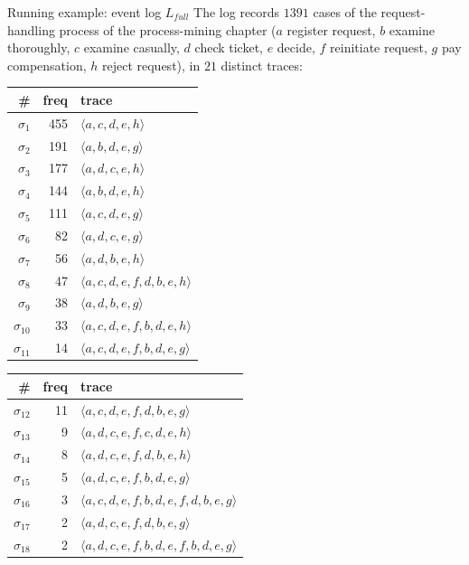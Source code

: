 \begin{examplebox}{Running example: event log $L_{full}$}
The log records $1391$ cases of the request-handling process of the process-mining chapter ($a$ register request, $b$ examine thoroughly, $c$ examine casually, $d$ check ticket, $e$ decide, $f$ reinitiate request, $g$ pay compensation, $h$ reject request), in $21$ distinct traces:
\begin{center}
\scriptsize
\begin{tabular}{rrl}
\toprule
\# & freq & trace \\
\midrule
$\sigma_1$ & 455 & $\langle a,c,d,e,h\rangle$ \\
$\sigma_2$ & 191 & $\langle a,b,d,e,g\rangle$ \\
$\sigma_3$ & 177 & $\langle a,d,c,e,h\rangle$ \\
$\sigma_4$ & 144 & $\langle a,b,d,e,h\rangle$ \\
$\sigma_5$ & 111 & $\langle a,c,d,e,g\rangle$ \\
$\sigma_6$ & 82 & $\langle a,d,c,e,g\rangle$ \\
$\sigma_7$ & 56 & $\langle a,d,b,e,h\rangle$ \\
$\sigma_8$ & 47 & $\langle a,c,d,e,f,d,b,e,h\rangle$ \\
$\sigma_9$ & 38 & $\langle a,d,b,e,g\rangle$ \\
$\sigma_{10}$ & 33 & $\langle a,c,d,e,f,b,d,e,h\rangle$ \\
$\sigma_{11}$ & 14 & $\langle a,c,d,e,f,b,d,e,g\rangle$ \\
\bottomrule
\end{tabular}
\quad
\begin{tabular}{rrl}
\toprule
\# & freq & trace \\
\midrule
$\sigma_{12}$ & 11 & $\langle a,c,d,e,f,d,b,e,g\rangle$ \\
$\sigma_{13}$ & 9 & $\langle a,d,c,e,f,c,d,e,h\rangle$ \\
$\sigma_{14}$ & 8 & $\langle a,d,c,e,f,d,b,e,h\rangle$ \\
$\sigma_{15}$ & 5 & $\langle a,d,c,e,f,b,d,e,g\rangle$ \\
$\sigma_{16}$ & 3 & $\langle a,c,d,e,f,b,d,e,f,d,b,e,g\rangle$ \\
$\sigma_{17}$ & 2 & $\langle a,d,c,e,f,d,b,e,g\rangle$ \\
$\sigma_{18}$ & 2 & $\langle a,d,c,e,f,b,d,e,f,b,d,e,g\rangle$ \\

\end{tabular}
\end{center}
\end{examplebox}
